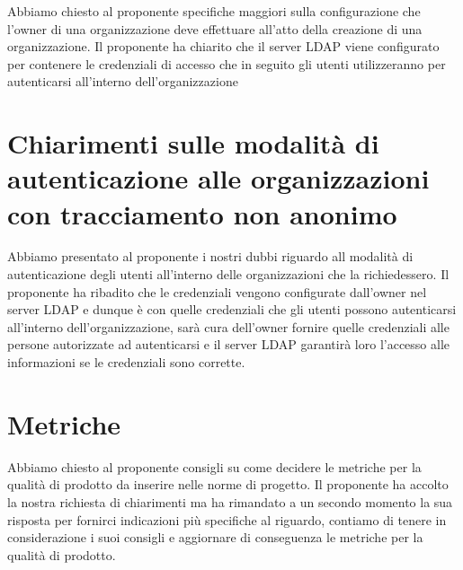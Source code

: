 \documentclass{article}
\begin{document}
Abbiamo chiesto al proponente specifiche maggiori sulla configurazione che l'owner di una organizzazione deve effettuare all'atto della creazione di una organizzazione. Il proponente ha chiarito che il server LDAP viene configurato per contenere le credenziali di accesso che in seguito gli utenti utilizzeranno per autenticarsi all'interno dell'organizzazione

\section{Chiarimenti sulle modalità di autenticazione alle organizzazioni con tracciamento non anonimo}%
\label{sec:chiarimenti_su_verifica}

Abbiamo presentato al proponente i nostri dubbi riguardo all modalità di autenticazione degli utenti all'interno delle organizzazioni che la richiedessero. Il proponente ha ribadito che le credenziali vengono configurate dall'owner nel server LDAP e dunque è con quelle credenziali che gli utenti possono autenticarsi all'interno dell'organizzazione, sarà cura dell'owner fornire quelle credenziali alle persone autorizzate ad autenticarsi e il server LDAP garantirà loro l'accesso alle informazioni se le credenziali sono corrette.

\section{Metriche}%
\label{sec:metriche}

Abbiamo chiesto al proponente consigli su come decidere le metriche per la qualità di prodotto da inserire nelle norme di progetto. Il proponente ha accolto la nostra richiesta di chiarimenti ma ha rimandato a un secondo momento la sua risposta per fornirci indicazioni più specifiche al riguardo, contiamo di tenere in considerazione i suoi consigli e aggiornare di conseguenza le metriche per la qualità di prodotto.

\newpage
\end{document}
